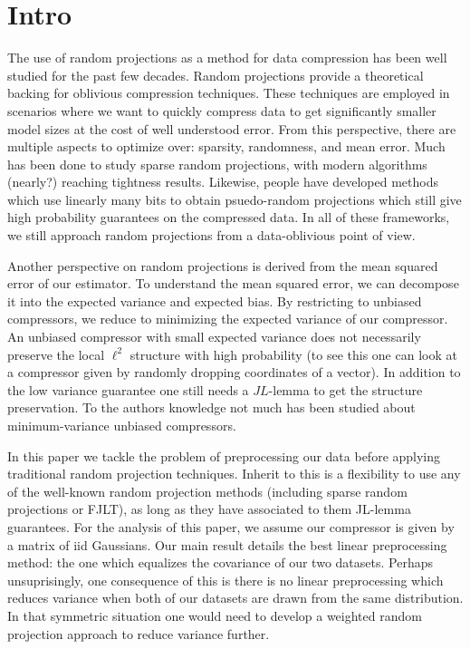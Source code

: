 \documentclass{article}
\theoremstyle{definition}
\theoremstyle{plain}
\begin{document}
\section{Intro}
The use of random projections as a method for data compression has been well studied for the past few decades. Random projections provide a theoretical backing for oblivious compression techniques. These techniques are employed in scenarios where we want to quickly compress data to get significantly smaller model sizes at the cost of well understood error. From this perspective, there are multiple aspects to optimize over: sparsity, randomness, and mean error. Much has been done to study sparse random projections, with modern algorithms (nearly?) reaching tightness results. Likewise, people have developed methods which use linearly many bits to obtain psuedo-random projections which still give high probability guarantees on the compressed data. In all of these frameworks, we still approach random projections from a data-oblivious point of view.

Another perspective on random projections is derived from the mean squared error of our estimator. To understand the mean squared error, we can decompose it into the expected variance and expected bias. By restricting to unbiased compressors, we reduce to minimizing the expected variance of our compressor. An unbiased compressor with small expected variance does not necessarily preserve the local $\ell^2$ structure with high probability (to see this one can look at a compressor given by randomly dropping coordinates of a vector). In addition to the low variance guarantee one still needs a $JL$-lemma to get the structure preservation. To the authors knowledge not much has been studied about minimum-variance unbiased compressors.

In this paper we tackle the problem of preprocessing our data before applying traditional random projection techniques. Inherit to this is a flexibility to use any of the well-known random projection methods (including sparse random projections or FJLT), as long as they have associated to them JL-lemma guarantees. For the analysis of this paper, we assume our compressor is given by a matrix of iid Gaussians. Our main result details the best linear preprocessing method: the one which equalizes the covariance of our two datasets. Perhaps unsuprisingly, one consequence of this is there is no linear preprocessing which reduces variance when both of our datasets are drawn from the same distribution. In that symmetric situation one would need to develop a weighted random projection approach to reduce variance further. 
\end{document}

